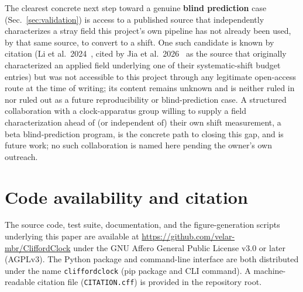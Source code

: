 \documentclass[aps,pra,superscriptaddress,groupedaddress,nofootinbib]{revtex4-2}
\begin{document}
The clearest concrete next step toward a genuine \textbf{blind
prediction} case (Sec.~\ref{sec:validation}) is access to a published
source that independently characterizes a stray field this project's
own pipeline has not already been used, by that same source, to convert
to a shift. One such candidate is known by citation
(Li et al.\ 2024~\cite{Li2024}, cited by Jia et al.\ 2026~\cite{Jia2026}
as the source that originally characterized an applied field underlying
one of their systematic-shift budget entries) but was not accessible to
this project through any legitimate open-access route at the time of
writing; its content remains unknown and is neither ruled in nor ruled
out as a future reproducibility or blind-prediction case. A structured
collaboration with a clock-apparatus group willing to supply a field
characterization ahead of (or independent of) their own shift
measurement, a beta blind-prediction program, is the concrete path
to closing this gap, and is future work; no such collaboration is
named here pending the owner's own outreach.

\FloatBarrier
\section{Code availability and citation}
\label{sec:code}

The source code, test suite, documentation, and the figure-generation
scripts underlying this paper are available at
\url{https://github.com/velar-mbr/CliffordClock} under the GNU
Affero General Public License v3.0 or later (AGPLv3). The Python
package and command-line interface are both distributed under the name
\texttt{cliffordclock} (pip package and CLI command). A machine-readable
citation file (\texttt{CITATION.cff}) is provided in the repository
root.


\end{document}
